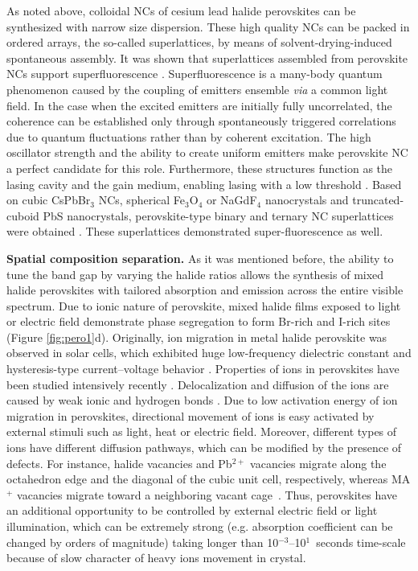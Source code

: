 \documentclass[journal=chreay,manuscript=review]{achemso}
\begin{document}
As noted above, colloidal NCs of cesium lead halide perovskites can be synthesized with narrow size dispersion. These high quality NCs can be packed in ordered arrays, the so-called superlattices, by means of solvent-drying-induced spontaneous assembly\cite{boles2016self, geuchies2016situ}. It was shown that superlattices assembled from perovskite NCs support superfluorescence \cite{raino2018superfluorescence}. Superfluorescence is a many-body quantum phenomenon caused by the coupling of emitters ensemble \textit{via} a common light field. In the case when the excited emitters are initially fully uncorrelated, the coherence can be established only through spontaneously triggered correlations due to quantum fluctuations rather than by coherent excitation. The high oscillator strength and the ability to create uniform emitters make perovskite NC a perfect candidate for this role. Furthermore, these structures function as the lasing cavity and the gain medium, enabling lasing with a low threshold \cite{zhou2021quantum}. Based on cubic CsPbBr$_3$ NCs, spherical Fe$_3$O$_4$ or NaGdF$_4$ nanocrystals and truncated-cuboid PbS nanocrystals, perovskite-type binary and ternary NC superlattices were obtained \cite{cherniukh2021perovskite}. These superlattices demonstrated  super-fluorescence as well. 



\textbf{Spatial composition separation.}
As it was mentioned before, the ability to tune the band gap by varying the halide ratios allows the synthesis of mixed halide perovskites with tailored absorption and emission across the entire visible spectrum. Due to ionic nature of perovskite, mixed halide films exposed to light or electric field demonstrate phase segregation to form Br-rich and I-rich sites (Figure \ref{fig:pero1}d). Originally, ion migration in metal halide perovskite was observed in solar cells, which exhibited huge low-frequency dielectric constant\cite{juarez2014photoinduced} and hysteresis-type current–voltage behavior \cite{jeon2014solvent}. Properties of ions in perovskites have been studied intensively recently \cite{yang2015significance}. Delocalization and diffusion of the ions are caused by weak ionic and hydrogen bonds \cite{wang2019stabilizing}. Due to low activation energy of ion migration in perovskites, directional movement of ions is easy activated by external stimuli such as light, heat or electric field. Moreover, different types of ions have different diffusion pathways, which can be modified by the presence of defects. For instance, halide vacancies and Pb$^{2+}$ vacancies migrate along the octahedron edge and the diagonal of the cubic unit cell, respectively, whereas MA$^+$ vacancies migrate toward a neighboring vacant cage~\cite{eames2015ionic}. Thus, perovskites have an additional opportunity to be controlled by external electric field or light illumination, which can be extremely strong (e.g. absorption coefficient can be changed by orders of magnitude) taking longer than 10$^{-3}$--10$^1$~seconds time-scale because of slow character of heavy ions movement in crystal.
\end{document}
